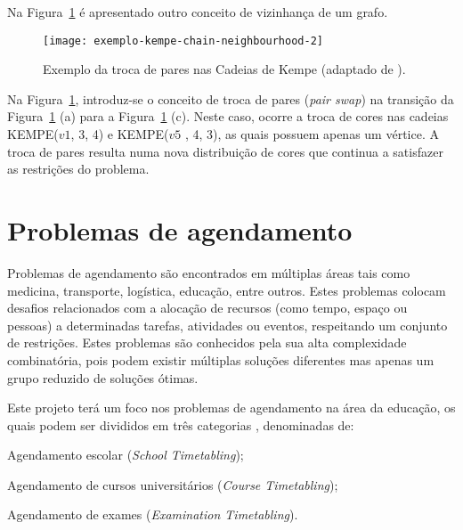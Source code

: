 Na Figura~\ref{fig:exemplo-kempe-chain-neighbourhood-2} é apresentado outro conceito de vizinhança de um grafo.

\begin{figure}[H]
    \centering
    \texttt{[image: exemplo-kempe-chain-neighbourhood-2]}
    \caption{Exemplo da troca de pares nas Cadeias de Kempe (adaptado de \cite{GuideGraphColouring-Lewis-2016}).}
    \label{fig:exemplo-kempe-chain-neighbourhood-2}
\end{figure}

Na Figura~\ref{fig:exemplo-kempe-chain-neighbourhood-2}, introduz-se o conceito de troca de pares (\textit{pair swap}) na transição da Figura~\ref{fig:exemplo-kempe-chain-neighbourhood-2} (a) para a Figura~\ref{fig:exemplo-kempe-chain-neighbourhood-2} (c). Neste caso, ocorre a troca de cores nas cadeias KEMPE($v1$, 3, 4) e KEMPE($v5$ , 4, 3), as quais possuem apenas um vértice. A troca de pares resulta numa nova distribuição de cores que continua a satisfazer as restrições do problema.

\section{Problemas de agendamento}
\label{capitulo2:Problemas-agendamento}

Problemas de agendamento são encontrados em múltiplas áreas tais como medicina, transporte, logística, educação, entre outros. Estes problemas colocam desafios relacionados com a alocação de recursos (como tempo, espaço ou pessoas) a determinadas tarefas, atividades ou eventos, respeitando um conjunto de restrições. Estes problemas são conhecidos pela sua alta complexidade combinatória, pois podem existir múltiplas soluções diferentes mas apenas um grupo reduzido de soluções ótimas.

Este projeto terá um foco nos problemas de agendamento na área da educação, os quais podem ser divididos em três categorias \cite{SurveyAutomatedTimetabling-Schaerf-1999}, denominadas de:

\begin{compactitem}
    \item Agendamento escolar (\textit{School Timetabling});
    \item Agendamento de cursos universitários (\textit{Course Timetabling});
    \item Agendamento de exames (\textit{Examination Timetabling}).
\end{compactitem}

